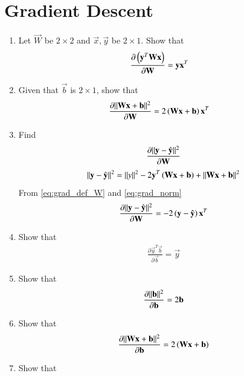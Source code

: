 \documentclass[journal,12pt,twocolumn]{IEEEtran}
\renewcommand\thesection{\arabic{section}}
\begin{document}
\section{Gradient Descent}
\begin{enumerate}[label=\thesection.\arabic*
,ref=\thesection.\theenumi]
\item Let $\vec{W}$ be $2\times 2$ and $\vec{x},\vec{y}$ be $2\times 1$.  Show that 
\begin{align}
\label{eq:grad_def_W}
\frac{\partial \left(\mathbf{y}^T\mathbf{W}\mathbf{x}\right)} {\partial\mathbf{W}} &= \mathbf{y}\mathbf{x}^T
\end{align}
\item Given that $\vec{b}$ is $2\times 1$, show that 
\begin{align}
\label{eq:grad_norm}
\frac{\partial \lVert\mathbf{W}\mathbf{x}+\mathbf{b}\rVert^2 }{\partial\mathbf{W}} &= 2\left(\mathbf{W}\mathbf{x}+\mathbf{b}\right)\mathbf{x}^T
\end{align}
\item Find
\begin{align}
\frac{\partial \lVert\mathbf{y}-\hat{\mathbf{y}}\rVert^2} {\partial\mathbf{W}} 
\end{align}
\solution
\begin{align}
\norm{\vec{y}-\hat{\vec{y}}}^2 = \norm{y}^2 - 2\vec{y}^T\brak{\vec{W}\vec{x}+\vec{b}}+ \norm{\mbf{W}\mbf{x}+\vec{b}}^2 %
\end{align}
%
From \eqref{eq:grad_def_W} and \eqref{eq:grad_norm}
\begin{align}
\frac{\partial \lVert\mathbf{y}-\hat{\mathbf{y}}\rVert^2} {\partial\mathbf{W}}  = - 2\left(\mathbf{y}-\hat{\mathbf{y}}\right)\mathbf{x}^T
\end{align}
\item Show that
\begin{align}
\frac{\partial \vec{y}^T\vec{b}} {\partial\vec{b}}  = \vec{y}
\end{align}
\item Show that
\begin{align}
\frac{\partial \lVert\mathbf{b}\rVert^2} {\partial\mathbf{b}}  = 2\mathbf{b}
\end{align}
\item Show that 
\begin{align}
\frac{\partial \lVert\mathbf{W}\mathbf{x}+\mathbf{b}\rVert^2} {\partial\mathbf{b}}  = 2\left(\mathbf{W}\mathbf{x}+\mathbf{b}\right)
\end{align}
\item Show that 

\end{enumerate}
\end{document}
